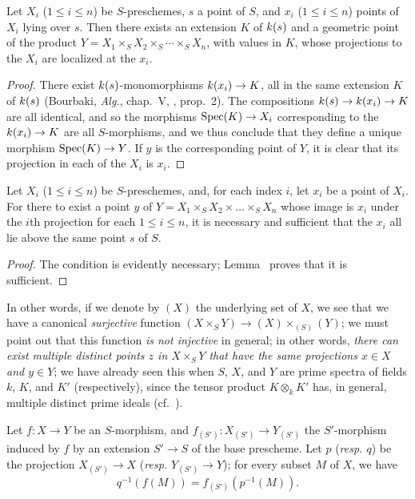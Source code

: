 \begin{lemma}[3.4.6]
\label{I.3.4.6}
Let $X_i$ ($1\leq i\leq n$) be $S$-preschemes, $s$ a point of $S$, and $x_i$
($1\leq i\leq n$) points of $X_i$ lying over $s$. Then there exists an extension
$K$ of $k(s)$ and a geometric point of the product
$Y=X_1\times_S X_2\times_S\cdots\times_S X_n$, with values in $K$, whose projections to
the $X_i$ are localized at the $x_i$.
\end{lemma}

\begin{proof}
There exist $k(s)$-monomorphisms $\kres(x_i)\to K$, all in the same extension $K$ of $k(s)$ (Bourbaki, \emph{Alg.}, chap.~V, , prop.~2).
The compositions $\kres(s)\to\kres(x_i)\to K$ are all identical, and so the morphisms $\Spec(K)\to X_i$ corresponding to the $\kres(x_i)\to K$ are all $S$-morphisms, and we thus conclude that they define a unique morphism $\Spec(K)\to Y$.
If $y$ is the corresponding point of $Y$, it is clear that its projection in each of the $X_i$ is $x_i$.
\end{proof}

\begin{proposition}[3.4.7]
\label{I.3.4.7}
Let $X_i$ ($1\leq i\leq n$) be $S$-preschemes, and, for each index $i$, let $x_i$ be a point of $X_i$.
For there to exist a point $y$ of $Y=X_1\times_S X_2\times\ldots\times_S X_n$ whose image is $x_i$ under the $i$th projection for each $1\leq i\leq n$, it is necessary and sufficient that the $x_i$ all lie above the same point $s$ of $S$.
\end{proposition}

\begin{proof}
The condition is evidently necessary; Lemma~ proves that it is sufficient.
\end{proof}

In other words, if we denote by $(X)$ the underlying set of $X$, we see that we have a canonical \emph{surjective} function $(X\times_S Y)\to(X)\times_{(S)}(Y)$; we must point out that this function \emph{is not injective} in general; in other words, \emph{there can exist multiple distinct points $z$ in $X\times_S Y$ that have the same projections $x\in X$ and $y\in Y$}; we have already seen this when $S$, $X$, and $Y$ are prime spectra of fields $k$, $K$, and $K'$ (respectively), since the tensor product $K\otimes_k K'$ has, in general, multiple distinct prime ideals (cf.~).

\begin{corollary}[3.4.8]
\label{I.3.4.8}
Let $f:X\to Y$ be an $S$-morphism, and $f_{(S')}:X_{(S')}\to Y_{(S')}$ the $S'$-morphism induced by $f$ by an extension $S'\to S$ of the base prescheme.
Let $p$ (\emph{resp. $q$}) be the projection $X_{(S')}\to X$ (\emph{resp. $Y_{(S')}\to Y$}); for every subset $M$ of $X$, we have
\[
  q^{-1}(f(M))=f_{(S')}(p^{-1}(M)).
\]
\end{corollary}

